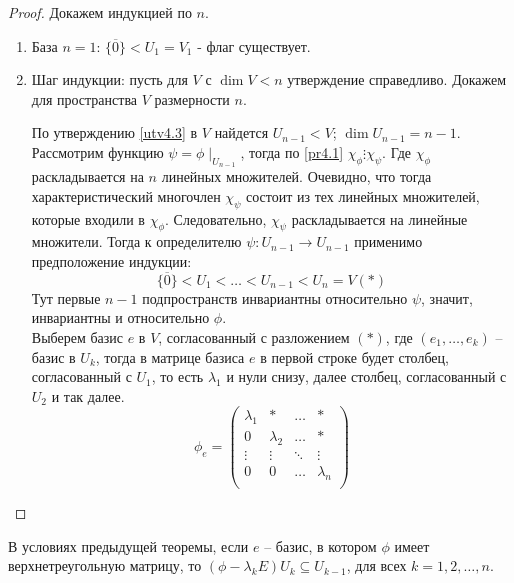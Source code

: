 \begin{proof}
    Докажем индукцией по $n$.
    \begin{enumerate}
        \item База $n = 1$: $\{ \overline{0} \} < U_1 = V_1$ - флаг существует.
        \item
        Шаг индукции: пусть для $V$ с $\dim V < n$ утверждение справедливо. Докажем для пространства 
        $V$ размерности $n$. 

        По утверждению \ref{utv4.3} в $V$ найдется $U_{n - 1} < V$; $\dim U_{n - 1} = n - 1$. 
        Рассмотрим функцию $\psi = \phi \mid_{U_{n - 1}}$, тогда по \ref{pr4.1} 
        $\chi_{\phi} \vdots \chi_{\psi}$. Где $\chi_{\phi}$ раскладывается на $n$ линейных множителей. 
        Очевидно, что тогда характеристический многочлен $\chi_{\psi}$ состоит из тех линейных множителей, 
        которые входили в $\chi_{\phi}$. Следовательно, $\chi_{\psi}$ раскладывается на линейные множители. 
        Тогда к определителю $\psi: U_{n - 1} \to U_{n - 1}$ применимо предположение индукции:
        $$\{ \overline{0} \} < U_1 < \dots < U_{n - 1} < U_n = V  (*)$$
        Тут первые $n - 1$ подпространств инвариантны относительно $\psi$, значит, инвариантны и относительно $\phi$. \\
        Выберем базис $e$ в $V$, согласованный с разложением $(*)$, где $(e_1, \dots, e_k)$ -- базис в $U_k$, 
        тогда в матрице базиса $e$ в первой строке будет столбец, согласованный с $U_1$, то есть 
        $\lambda_1$ и нули снизу, далее столбец, согласованный с $U_2$ и так далее.
        \begin{equation*}
            \phi_e =
            \left(
                \begin{array}{cccc}
                    \lambda_1 & * & \dots & * \\
                    0 & \lambda_2 & \dots & * \\
                    \vdots & \vdots & \ddots & \vdots \\
                    0 & 0 & \dots & \lambda_n \\
                \end{array}
                \right)
            \end{equation*}
    \end{enumerate}
\end{proof}

\begin{corollary}
    В условиях предыдущей теоремы, если $e$ -- базис, в котором $\phi$ имеет верхнетреугольную матрицу, 
    то $(\phi - \lambda_k E) U_k \subseteq U_{k - 1}$, для всех $k = 1, 2, \dots, n$.
\end{corollary}

